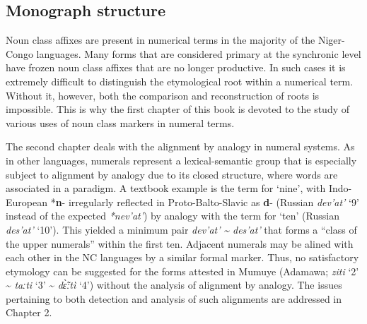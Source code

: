 \subsection*{Monograph structure}
 Noun class affixes are present in numerical terms in the majority of the Niger-Congo languages. Many forms that are considered primary at the synchronic level have frozen noun class affixes that are no longer productive. In such cases it is extremely difficult to distinguish the etymological root within a numerical term. Without it, however, both the comparison and reconstruction of roots is impossible. This is why the first chapter of this book is devoted to the study of various uses of noun class markers in numeral terms.

The second chapter deals with the alignment by analogy in numeral systems. As in other languages, numerals represent a lexical-semantic group that is especially subject to alignment by analogy due to its closed structure, where words are associated in a paradigm. A textbook example is the term for ‘nine’, with Indo-European *\textbf{n}{}- irregularly reflected in Proto-Balto-Slavic as \textbf{d}{}- (Russian \textit{dev’at’} ‘9’ instead of the expected \textit{*nev’at’}) by analogy with the term for ‘ten’ (Russian \textit{des’at’} ‘10’). This yielded a minimum pair \textit{dev’at’} \textit{{\textasciitilde} des’at’} that forms a “class of the upper numerals” within the first ten. Adjacent numerals may be alined with each other in the NC languages by a similar formal marker. Thus, no satisfactory etymology can be suggested for the forms attested in Mumuye (Adamawa; \textit{ziti} ‘2’ {\textasciitilde} \textit{taːti} ‘3’ {\textasciitilde} \textit{d{\~{\`ɛ}}ːt{\`{i}}} ‘4’) without the analysis of alignment by analogy. The issues pertaining to both detection and analysis of such alignments are addressed in Chapter 2.

